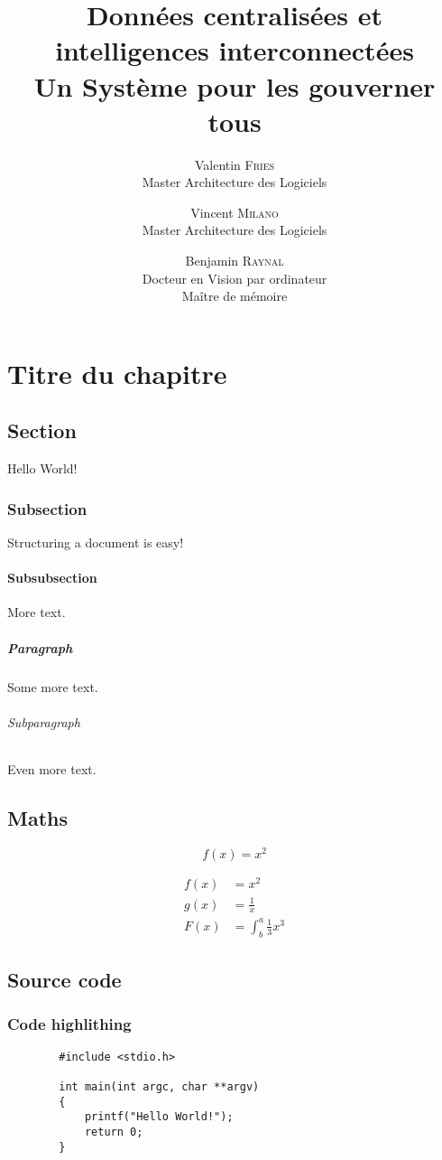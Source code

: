 \documentclass{report}
\title{
    \huge Données centralisées et intelligences interconnectées \\
    \LARGE Un Système pour les gouverner tous
}
\author{
    Valentin \textsc{Fries} \\ Master Architecture des Logiciels 
    \and
    Vincent \textsc{Milano} \\ Master Architecture des Logiciels
    \and
    Benjamin \textsc{Raynal} \\ Docteur en Vision par ordinateur \\ Maître de mémoire
}
\begin{document}
\maketitle

\newpage
\tableofcontents

\newpage
{}

\chapter{Titre du chapitre}
    \section{Section}
    Hello World!

        \subsection{Subsection}
        Structuring a document is easy!

            \subsubsection{Subsubsection}
            More text.

            \paragraph{Paragraph}
            Some more text.

                \subparagraph{Subparagraph}
                Even more text.

    \section{Maths}
    \begin{equation*}
        f(x) = x^2
    \end{equation*}

    \begin{align*}
        f(x) &= x^2\\
        g(x) &= \frac{1}{x}\\
        F(x) &= \int^a_b \frac{1}{3}x^3
    \end{align*}

    \section{Source code}
    \subsection{Code highlithing}
    \begin{lstlisting}
        #include <stdio.h>

        int main(int argc, char **argv)
        {
            printf("Hello World!");
            return 0;
        }
    \end{lstlisting}
\end{document}
